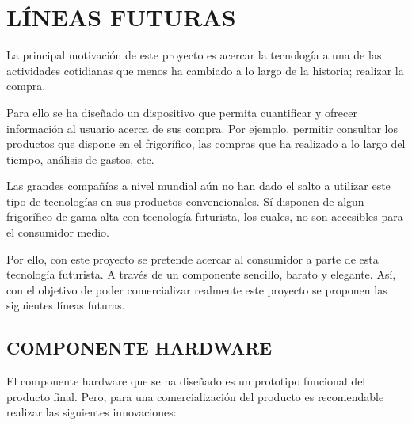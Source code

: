 \chapter{LÍNEAS FUTURAS}

La principal motivación de este proyecto es acercar la tecnología a una de las actividades cotidianas que menos ha cambiado a lo largo de la historia; realizar la compra.

Para ello se ha diseñado un dispositivo que permita cuantificar y ofrecer información al usuario acerca de sus compra. Por ejemplo, permitir consultar los productos que dispone en el frigorífico, las compras que ha realizado a lo largo del tiempo, análisis de gastos, etc.

Las grandes compañías a nivel mundial aún no han dado el salto a utilizar este tipo de tecnologías en sus productos convencionales. Sí disponen de algun frigorífico de gama alta con tecnología futurista, los cuales, no son accesibles para el consumidor medio.

Por ello, con este proyecto se pretende acercar al consumidor a parte de esta tecnología futurista. A través de un componente sencillo, barato y elegante. Así, con el objetivo de poder comercializar realmente este proyecto se proponen las siguientes líneas futuras.

\section{COMPONENTE HARDWARE}

El componente hardware que se ha diseñado es un prototipo funcional del producto final. Pero, para una comercialización del producto es recomendable realizar las siguientes innovaciones:

